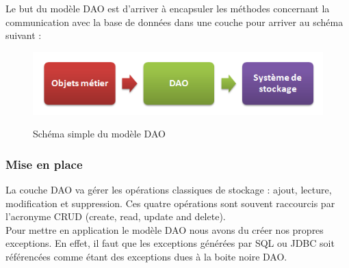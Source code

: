 Le but du modèle DAO est d'arriver à encapsuler les méthodes concernant la communication avec la base de données dans une couche pour arriver au schéma suivant :

\begin{figure}[!h]
  \center
  \includegraphics[scale=0.5]{../graph/dao1.png} \\
  \caption{Schéma simple du modèle DAO}
\end{figure}

\subsubsection{Mise en place}
La couche DAO va gérer les opérations classiques de stockage : ajout, lecture, modification et suppression. Ces quatre opérations sont souvent raccourcis par l'acronyme CRUD (create, read, update and delete). \\

Pour mettre en application le modèle DAO nous avons du créer nos propres exceptions. En effet, il faut que les exceptions générées par SQL ou JDBC soit référencées comme étant des exceptions dues à la boite noire DAO. 

